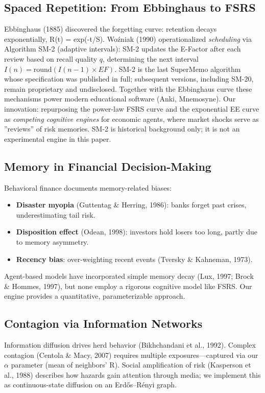 \documentclass[11pt]{article}
\begin{document}
\subsection{Spaced Repetition: From Ebbinghaus to FSRS}
Ebbinghaus (1885) discovered the forgetting curve: retention decays exponentially, R(t) = exp(-t/S). Woźniak (1990) operationalized \textit{scheduling} via Algorithm SM-2 (adaptive intervals): SM-2 updates the E-Factor after each review based on recall quality $q$, determining the next interval $I(n) = \mathrm{round}(I(n-1) \times EF)$. SM-2 is the last SuperMemo algorithm whose specification was published in full; subsequent versions, including SM-20, remain proprietary and undisclosed. Together with the Ebbinghaus curve these mechanisms power modern educational software (Anki, Mnemosyne). Our innovation: repurposing the power-law FSRS curve and the exponential EE curve as \textit{competing cognitive engines} for economic agents, where market shocks serve as ''reviews'' of risk memories. SM-2 is historical background only; it is not an experimental engine in this paper.

\subsection{Memory in Financial Decision-Making}
Behavioral finance documents memory-related biases:

\begin{itemize}
\item \textbf{Disaster myopia} (Guttentag \& Herring, 1986): banks forget past crises, underestimating tail risk.
\item \textbf{Disposition effect} (Odean, 1998): investors hold losers too long, partly due to memory asymmetry.
\item \textbf{Recency bias}: over-weighting recent events (Tversky \& Kahneman, 1973).
\end{itemize}

Agent-based models have incorporated simple memory decay (Lux, 1997; Brock \& Hommes, 1997), but none employ a rigorous cognitive model like FSRS. Our engine provides a quantitative, parameterizable approach.

\subsection{Contagion via Information Networks}
Information diffusion drives herd behavior (Bikhchandani et al., 1992). Complex contagion (Centola \& Macy, 2007) requires multiple exposures---captured via our $\alpha$ parameter (mean of neighbors' R). Social amplification of risk (Kasperson et al., 1988) describes how hazards gain attention through media; we implement this as continuous-state diffusion on an Erdős--Rényi graph.
\end{document}

